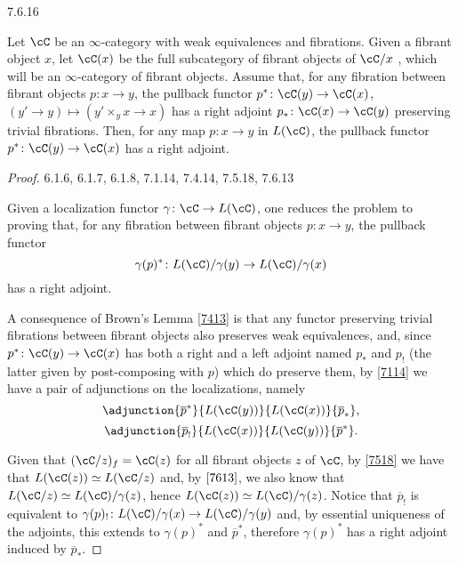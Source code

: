\begin{thm}\label{7616}
  7.6.16

  Let $\cC$ be an $\infty$-category with weak equivalences and fibrations. Given
  a fibrant object $x$, let $\cC(x)$ be the full subcategory of fibrant objects
  of $\cC/x$ , which will be an $\infty$-category of
  fibrant objects. Assume that, for any fibration between fibrant objects
  $p\colon x\rightarrow y$, the pullback functor
  $p^*\colon\cC(y)\rightarrow\cC(x)$, $(y'\rightarrow y)\mapsto(y'\times_y
  x\rightarrow x)$ has a right adjoint $p_*\colon\cC(x)\rightarrow\cC(y)$
  preserving trivial fibrations. Then, for any map $p\colon x\rightarrow y$ in
  $L(\cC)$, the pullback functor $p^*\colon\cC(y)\rightarrow\cC(x)$ has a right
  adjoint.
\end{thm}
\begin{proof}
  6.1.6, 6.1.7, 6.1.8, 7.1.14, 7.4.14, 7.5.18, 7.6.13

  Given a localization functor $\gamma\colon\cC\rightarrow L(\cC)$, one reduces
  the problem to proving that, for any fibration between fibrant objects
  $p\colon x\rightarrow y$, the pullback functor
  \[\gamma(p)^*\colon L(\cC)/\gamma(y)\rightarrow L(\cC)/\gamma(x)\]
  has a right adjoint.

  A consequence of Brown's Lemma \ref{7413} is that any functor preserving
  trivial fibrations between fibrant objects also preserves weak equivalences,
  and, since $p^*\colon\cC(y)\rightarrow\cC(x)$ has both a right and a left
  adjoint named $p_*$ and $p_!$ (the latter given by post-composing with $p$)
  which do preserve them, by \ref{7114} we have a pair of adjunctions on the
  localizations, namely
  \[\adjunction{\overline{p}^*}{L(\cC(y))}{L(\cC(x))}{\overline{p}_*},\]
  \[\adjunction{\overline{p}_!}{L(\cC(x))}{L(\cC(y))}{\overline{p}^*}.\]

  Given that $(\cC/z)_f=\cC(z)$ for all fibrant objects $z$ of $\cC$, by
  \ref{7518} we have that $L(\cC(z))\simeq L(\cC/z)$ and, by $\ref{7613}$, we
  also know that $L(\cC/z)\simeq L(\cC)/\gamma(z)$, hence $L(\cC(z))\simeq
  L(\cC)/\gamma(z)$. Notice that $\overline{p}_!$ is equivalent to
  $\gamma(p)_!\colon L(\cC)/\gamma(x)\rightarrow L(\cC)/\gamma(y)$ and, by
  essential uniqueness of the adjoints, this extends to $\gamma(p)^*$ and
  $\overline{p}^*$, therefore $\gamma(p)^*$ has a right adjoint induced by
  $\overline{p}_*$.
\end{proof}

